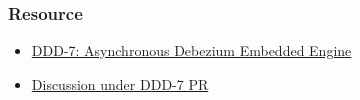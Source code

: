 \documentclass[10pt,utf8]{beamer}
\begin{document}
\begin{frame}
    \frametitle{Resource}
    \begin{itemize}
        \color{blue}
        \item \href{https://github.com/debezium/debezium-design-documents/blob/main/DDD-7.md}{DDD-7: Asynchronous Debezium Embedded Engine}
        \item \href{https://github.com/debezium/debezium-design-documents/pull/8}{Discussion under DDD-7 PR}
        \color{black}
    \end{itemize}
\end{frame}



\end{document}
